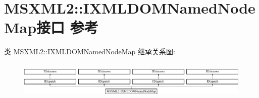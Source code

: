 \hypertarget{interface_m_s_x_m_l2_1_1_i_x_m_l_d_o_m_named_node_map}{}\section{M\+S\+X\+M\+L2\+:\+:I\+X\+M\+L\+D\+O\+M\+Named\+Node\+Map接口 参考}
\label{interface_m_s_x_m_l2_1_1_i_x_m_l_d_o_m_named_node_map}
类 M\+S\+X\+M\+L2\+:\+:I\+X\+M\+L\+D\+O\+M\+Named\+Node\+Map 继承关系图\+:\begin{figure}[H]
\begin{center}
\leavevmode
\includegraphics[height=1.802575cm]{interface_m_s_x_m_l2_1_1_i_x_m_l_d_o_m_named_node_map}
\end{center}
\end{figure}
